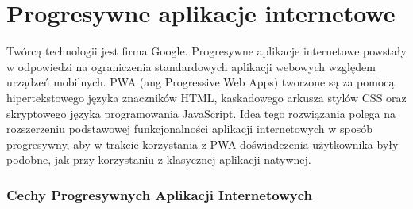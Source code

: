 \documentclass[a4paper,12pt,twoside,openany]{report}
\begin{document}
\chapter{Progresywne aplikacje internetowe} \label{chap:pwa}
\noindent Twórcą technologii jest firma Google. Progresywne aplikacje internetowe powstały w odpowiedzi na ograniczenia standardowych aplikacji webowych względem urządzeń mobilnych. PWA (ang Progressive Web Apps) tworzone są za pomocą hipertekstowego języka znaczników HTML, kaskadowego arkusza stylów CSS oraz skryptowego języka programowania JavaScript. Idea tego rozwiązania polega na rozszerzeniu podstawowej funkcjonalno\'sci aplikacji internetowych w sposób progresywny, aby w trakcie korzystania z PWA do\'swiadczenia użytkownika były podobne, jak przy korzystaniu z klasycznej aplikacji natywnej.
\subsection*{Cechy Progresywnych Aplikacji Internetowych}
\end{document}
